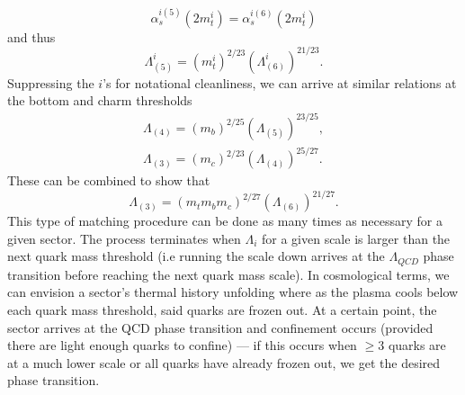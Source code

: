 \documentclass[nofootinbib,twocolumn,preprintnumbers]{revtex4-1}
\begin{document}
\begin{equation}
\alpha_s^{i(5)}(2 m^i_t) = \alpha_s^{i(6)}(2 m^i_t) 
\end{equation} 
and thus
\begin{equation}
\Lambda_{(5)}^i = (m_t^{i})^{2/23}(\Lambda_{(6)}^i)^{21/23}.
\end{equation}
Suppressing the $i$'s for notational cleanliness, we can arrive at similar relations at the bottom and charm thresholds
\begin{equation}
\begin{split}
\Lambda_{(4)} = (m_b)^{2/25}(\Lambda_{(5)})^{23/25},
\\
\Lambda_{(3)} = (m_c)^{2/23}(\Lambda_{(4)})^{25/27}.
\end{split}
\end{equation}
These can be combined to show that
\begin{equation}
\Lambda_{(3)} = (m_t m_b m_c)^{2/27}(\Lambda_{(6)})^{21/27}.
\end{equation}
This type of matching procedure can be done as many times as necessary for a given sector. The process terminates when $\Lambda_i$ for a given scale is larger than the next quark mass threshold (i.e running the scale down arrives at the $\Lambda_{QCD}$ phase transition before reaching the next quark mass scale).
In cosmological terms, we can envision a sector's thermal history unfolding where as the plasma cools below each quark mass threshold, said quarks are frozen out. At a certain point, the sector arrives at the QCD phase transition and confinement occurs (provided there are light enough quarks to confine) --- if this occurs when $\geq 3$ quarks are at a much lower scale or all quarks have already frozen out, we get the desired phase transition.   
\end{document}
